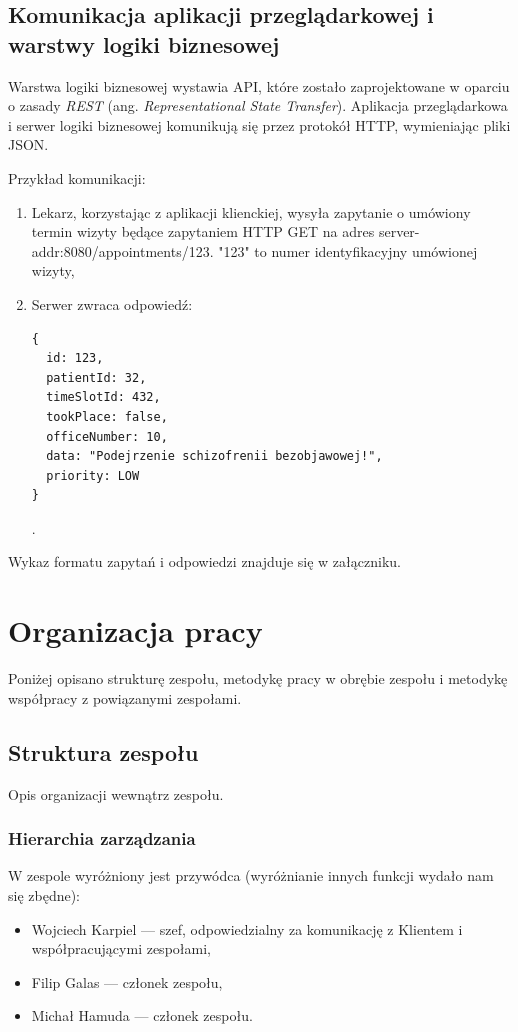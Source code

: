 \documentclass[polish,12pt]{aghthesis}
\begin{document}
\subsection{Komunikacja aplikacji przeglądarkowej i warstwy logiki biznesowej}
Warstwa logiki biznesowej wystawia API, które zostało zaprojektowane w oparciu o zasady \emph{REST} (ang. \emph{Representational State Transfer}). Aplikacja przeglądarkowa i serwer logiki biznesowej komunikują się przez protokół HTTP, wymieniając pliki JSON.

Przykład komunikacji:

\begin{enumerate}
  \item Lekarz, korzystając z aplikacji klienckiej, wysyła zapytanie o umówiony termin wizyty będące zapytaniem HTTP GET na adres server-addr:8080/appointments/123. "123" to numer identyfikacyjny umówionej wizyty,
  \item Serwer zwraca odpowiedź:
\begin{verbatim}
{    
  id: 123,
  patientId: 32,
  timeSlotId: 432,
  tookPlace: false,
  officeNumber: 10,
  data: "Podejrzenie schizofrenii bezobjawowej!",
  priority: LOW
}
\end{verbatim}.
\end{enumerate}

Wykaz formatu zapytań i odpowiedzi znajduje się w załączniku.

\section{Organizacja pracy}
\label{sec:organizacja-pracy}

Poniżej opisano strukturę zespołu, metodykę pracy w obrębie zespołu i metodykę współpracy z powiązanymi zespołami.
  
\subsection{Struktura zespołu}
Opis organizacji wewnątrz zespołu.
\subsubsection{Hierarchia zarządzania}
W zespole wyróżniony jest przywódca (wyróżnianie innych funkcji wydało nam się zbędne):
\begin{itemize}
    \item Wojciech Karpiel --- szef, odpowiedzialny za komunikację z Klientem i współpracującymi zespołami,
    \item Filip Galas --- członek zespołu,
    \item Michał Hamuda --- członek zespołu.
\end{itemize}
\end{document}
